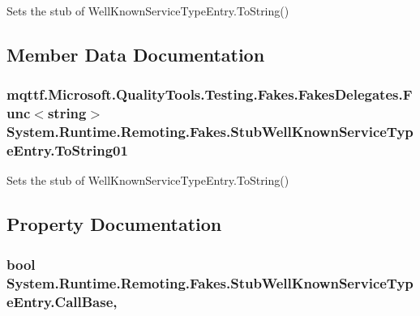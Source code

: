 Sets the stub of Well\-Known\-Service\-Type\-Entry.\-To\-String()



\subsection{Member Data Documentation}
\hypertarget{class_system_1_1_runtime_1_1_remoting_1_1_fakes_1_1_stub_well_known_service_type_entry_aae5d86a0df55128ff3247ecd0a16fed8}{
\subsubsection[{To\-String01}]{\setlength{\rightskip}{0pt plus 5cm}mqttf.\-Microsoft.\-Quality\-Tools.\-Testing.\-Fakes.\-Fakes\-Delegates.\-Func$<$string$>$ System.\-Runtime.\-Remoting.\-Fakes.\-Stub\-Well\-Known\-Service\-Type\-Entry.\-To\-String01}}\label{class_system_1_1_runtime_1_1_remoting_1_1_fakes_1_1_stub_well_known_service_type_entry_aae5d86a0df55128ff3247ecd0a16fed8}


Sets the stub of Well\-Known\-Service\-Type\-Entry.\-To\-String()



\subsection{Property Documentation}
\hypertarget{class_system_1_1_runtime_1_1_remoting_1_1_fakes_1_1_stub_well_known_service_type_entry_aaab4c8b2dd032de3d0d47b6ab2a0905b}{
\subsubsection[{Call\-Base}]{\setlength{\rightskip}{0pt plus 5cm}bool System.\-Runtime.\-Remoting.\-Fakes.\-Stub\-Well\-Known\-Service\-Type\-Entry.\-Call\-Base\hspace{0.3cm}{\ttfamily [get]}, {\ttfamily [set]}}}\label{class_system_1_1_runtime_1_1_remoting_1_1_fakes_1_1_stub_well_known_service_type_entry_aaab4c8b2dd032de3d0d47b6ab2a0905b}


